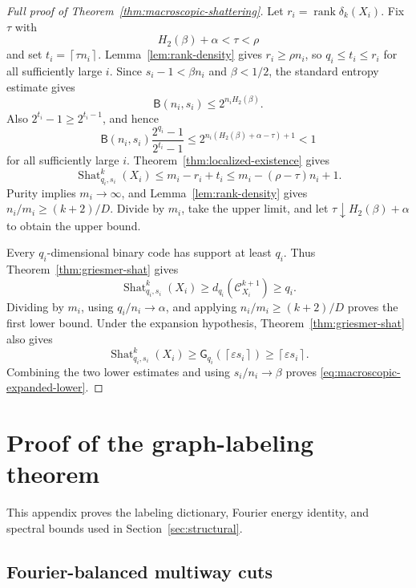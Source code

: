 \documentclass[11pt,letterpaper]{article}
\theoremstyle{plain}
\theoremstyle{definition}
\newcommand{\cC}{\mathcal{C}}
\newcommand{\rank}{\operatorname{rank}}
\newcommand{\Shat}{\operatorname{Shat}}
\newcommand{\1}{\mathbf{1}}
\newcommand{\ceil}[1]{\left\lceil#1\right\rceil}
\begin{document}
\begin{proof}[Full proof of Theorem~\ref{thm:macroscopic-shattering}]
Let $r_i=\rank\delta_k(X_i)$.  Fix $\tau$ with
\[
 H_2(\beta)+\alpha<\tau<\rho
\]
and set $t_i=\ceil{\tau n_i}$.  Lemma~\ref{lem:rank-density} gives
$r_i\ge\rho n_i$, so $q_i\le t_i\le r_i$ for all sufficiently large $i$.  Since
$s_i-1<\beta n_i$ and $\beta<1/2$, the standard entropy estimate gives
\[
 \mathsf B(n_i,s_i)\le2^{n_i H_2(\beta)}.
\]
Also $2^{t_i}-1\ge2^{t_i-1}$, and hence
\[
 \mathsf B(n_i,s_i)\frac{2^{q_i}-1}{2^{t_i}-1}
 \le2^{n_i(H_2(\beta)+\alpha-\tau)+1}<1
\]
for all sufficiently large $i$.  Theorem~\ref{thm:localized-existence} gives
\[
 \Shat_{q_i,s_i}^k(X_i)
 \le m_i-r_i+t_i
 \le m_i-(\rho-\tau)n_i+1.
\]
Purity implies $m_i\to\infty$, and Lemma~\ref{lem:rank-density} gives
$n_i/m_i\ge(k+2)/D$.  Divide by $m_i$, take the upper limit, and let
$\tau\downarrow H_2(\beta)+\alpha$ to obtain the upper bound.

Every $q_i$-dimensional binary code has support at least $q_i$.  Thus
Theorem~\ref{thm:griesmer-shat} gives
\[
 \Shat_{q_i,s_i}^k(X_i)\ge d_{q_i}(\cC_{X_i}^{k+1})\ge q_i.
\]
Dividing by $m_i$, using $q_i/n_i\to\alpha$, and applying
$n_i/m_i\ge(k+2)/D$ proves the first lower bound.  Under the expansion hypothesis,
Theorem~\ref{thm:griesmer-shat} also gives
\[
 \Shat_{q_i,s_i}^k(X_i)
 \ge\mathsf G_{q_i}(\ceil{\varepsilon s_i})
 \ge\ceil{\varepsilon s_i}.
\]
Combining the two lower estimates and using $s_i/n_i\to\beta$ proves
\eqref{eq:macroscopic-expanded-lower}.
\end{proof}

\section{Proof of the graph-labeling theorem}
\label{app:graph-proofs}

This appendix proves the labeling dictionary, Fourier energy identity, and spectral
bounds used in Section~\ref{sec:structural}.

\subsection{Fourier-balanced multiway cuts}
\label{app:fourier-proof}
\end{document}
